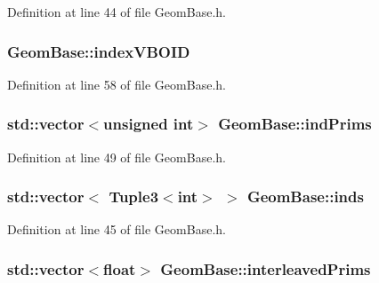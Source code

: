 Definition at line 44 of file Geom\-Base.\-h.

\hypertarget{class_geom_base_ac9801ee653f63ed5d544a237cc485183}{
\subsubsection[{index\-V\-B\-O\-I\-D}]{ Geom\-Base\-::index\-V\-B\-O\-I\-D\hspace{0.3cm}{\ttfamily [protected]}}}\label{class_geom_base_ac9801ee653f63ed5d544a237cc485183}


Definition at line 58 of file Geom\-Base.\-h.

\hypertarget{class_geom_base_a99010b39b4d43e01a899f9c88f64cb28}{
\subsubsection[{ind\-Prims}]{\setlength{\rightskip}{0pt plus 5cm}std\-::vector$<$unsigned int$>$ Geom\-Base\-::ind\-Prims\hspace{0.3cm}{\ttfamily [protected]}}}\label{class_geom_base_a99010b39b4d43e01a899f9c88f64cb28}


Definition at line 49 of file Geom\-Base.\-h.

\hypertarget{class_geom_base_ab6559c65d93ef3e006b66a951fa40300}{
\subsubsection[{inds}]{\setlength{\rightskip}{0pt plus 5cm}std\-::vector$<$ {\bf Tuple3}$<$int$>$ $>$ Geom\-Base\-::inds\hspace{0.3cm}{\ttfamily [protected]}}}\label{class_geom_base_ab6559c65d93ef3e006b66a951fa40300}


Definition at line 45 of file Geom\-Base.\-h.

\hypertarget{class_geom_base_a0800fd85697c8b330d0635a2c80f1c8d}{
\subsubsection[{interleaved\-Prims}]{\setlength{\rightskip}{0pt plus 5cm}std\-::vector$<$float$>$ Geom\-Base\-::interleaved\-Prims\hspace{0.3cm}{\ttfamily [protected]}}}\label{class_geom_base_a0800fd85697c8b330d0635a2c80f1c8d}


